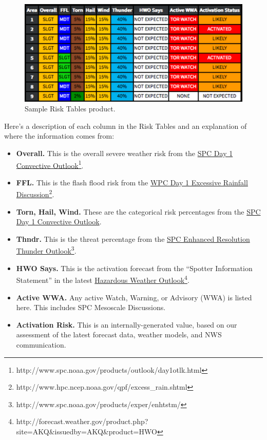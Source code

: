 \documentclass[pdflatex,letterpaper,twoside,12pt]{book}
\begin{document}
\begin{figure}[h]
  \centering
  \includegraphics[width=\textwidth,keepaspectratio=true]{img/ops-risk-tables-sample}
  \caption{Sample Risk Tables product.\label{fig:ops-risk-tables-sample}}
\end{figure}

Here's a description of each column in the Risk Tables and an explanation of where the information comes from:

\begin{itemize}
\item \textbf{Overall.} This is the overall severe weather risk from the \href{http://www.spc.noaa.gov/products/outlook/day1otlk.html}{SPC Day 1 Convective Outlook}\footnote{http://www.spc.noaa.gov/products/outlook/day1otlk.html}.
\item \textbf{FFL.} This is the flash flood risk from the \href{http://www.hpc.ncep.noaa.gov/qpf/excess_rain.shtml}{WPC Day 1 Excessive Rainfall Discussion}\footnote{http://www.hpc.ncep.noaa.gov/qpf/excess\_rain.shtml}. 
\item \textbf{Torn, Hail, Wind.} These are the categorical risk percentages from the \href{http://www.spc.noaa.gov/products/outlook/day1otlk.html}{SPC Day 1 Convective Outlook}.
\item \textbf{Thndr.} This is the threat percentage from the \href{http://www.spc.noaa.gov/products/exper/enhtstm/}{SPC Enhanced Resolution Thunder Outlook}\footnote{http://www.spc.noaa.gov/products/exper/enhtstm/}.
\item \textbf{HWO Says.}  This is the activation forecast from the ``Spotter Information Statement'' in the latest \href{http://forecast.weather.gov/product.php?site=AKQ&issuedby=AKQ&product=HWO}{Hazardous Weather Outlook}\footnote{http://forecast.weather.gov/product.php?site=AKQ\&issuedby=AKQ\&product=HWO}.
\item \textbf{Active WWA.}  Any active Watch, Warning, or Advisory (WWA) is listed here.  This includes SPC Mesoscale Discussions.
\item \textbf{Activation Risk.}  This is an internally-generated value, based on our assessment of the latest forecast data, weather models, and NWS communication.
\end{itemize}
\end{document}

